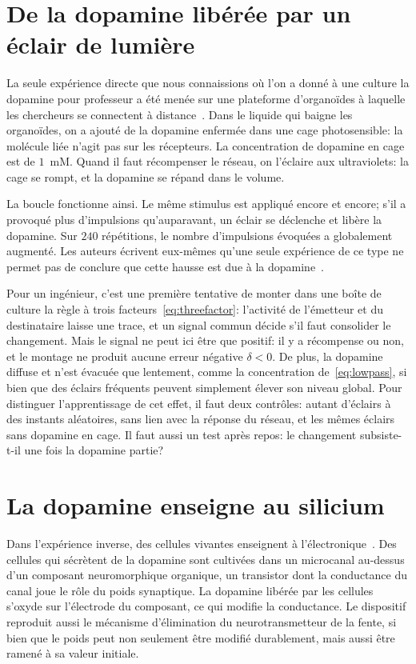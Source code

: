 \section{De la dopamine libérée par un éclair de lumière}
\label{sec:dishdopamine}

La seule expérience directe que nous connaissions où l'on a donné à une culture la dopamine pour professeur a été menée sur une plateforme d'organoïdes à laquelle les chercheurs se connectent à distance~\cite{Jordan2024}. Dans le liquide qui baigne les organoïdes, on a ajouté de la dopamine enfermée dans une \og cage\fg{} photosensible: la molécule liée n'agit pas sur les récepteurs. La concentration de dopamine en cage est de $1$~mM. Quand il faut récompenser le réseau, on l'éclaire aux ultraviolets: la cage se rompt, et la dopamine se répand dans le volume.

La boucle fonctionne ainsi. Le même stimulus est appliqué encore et encore; s'il a provoqué plus d'impulsions qu'auparavant, un éclair se déclenche et libère la dopamine. Sur $240$ répétitions, le nombre d'impulsions évoquées a globalement augmenté. Les auteurs écrivent eux-mêmes qu'une seule expérience de ce type ne permet pas de conclure que cette hausse est due à la dopamine~\cite{Jordan2024}.

Pour un ingénieur, c'est une première tentative de monter dans une boîte de culture la règle à trois facteurs~\eqref{eq:threefactor}: l'activité de l'émetteur et du destinataire laisse une trace, et un signal commun décide s'il faut consolider le changement. Mais le signal ne peut ici être que positif: il y a récompense ou non, et le montage ne produit aucune erreur négative $\delta<0$. De plus, la dopamine diffuse et n'est évacuée que lentement, comme la concentration de~\eqref{eq:lowpass}, si bien que des éclairs fréquents peuvent simplement élever son niveau global. Pour distinguer l'apprentissage de cet effet, il faut deux contrôles: autant d'éclairs à des instants aléatoires, sans lien avec la réponse du réseau, et les mêmes éclairs sans dopamine en cage. Il faut aussi un test après repos: le changement subsiste-t-il une fois la dopamine partie?

\section{La dopamine enseigne au silicium}
\label{sec:biohybrid}

Dans l'expérience inverse, des cellules vivantes enseignent à l'électronique~\cite{Keene2020}. Des cellules qui sécrètent de la dopamine sont cultivées dans un microcanal au-dessus d'un composant neuromorphique organique, un transistor dont la conductance du canal joue le rôle du poids synaptique. La dopamine libérée par les cellules s'oxyde sur l'électrode du composant, ce qui modifie la conductance. Le dispositif reproduit aussi le mécanisme d'élimination du neurotransmetteur de la fente, si bien que le poids peut non seulement être modifié durablement, mais aussi être ramené à sa valeur initiale.


